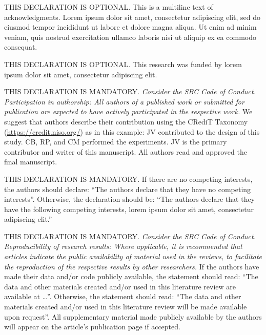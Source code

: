 \documentclass[english]{sbc2025}%
\begin{document}
\begin{declarations}

\begin{acknowledgements}
THIS DECLARATION IS OPTIONAL. 
This is a multiline text of acknowledgments. 
Lorem ipsum dolor sit amet, consectetur adipiscing elit, 
sed do eiusmod tempor incididunt ut labore et dolore magna aliqua. 
Ut enim ad minim veniam, quis nostrud exercitation ullamco laboris nisi ut aliquip ex ea commodo consequat.
\end{acknowledgements}

\begin{funding}
THIS DECLARATION IS OPTIONAL. This research was funded by lorem ipsum dolor sit amet, consectetur adipiscing elit.
\end{funding}

\begin{contributions}
THIS DECLARATION IS MANDATORY. 
\textit{Consider the SBC Code of Conduct.
Participation in authorship: All authors of a published work
or submitted for publication are expected to have actively participated in the respective work.}
We suggest that authors describe their contribution using
the CRediT Taxonomy (\href{https://credit.niso.org/}{https://credit.niso.org/}) as in this example:
JV contributed to the design of this study. CB, RP, and CM performed the experiments.
JV is the primary contributor and writer of this manuscript.
All authors read and approved the final manuscript.
\end{contributions}

\begin{interests}
THIS DECLARATION IS MANDATORY. If there are no competing interests, the authors should declare: ``The authors declare that they have no competing interests''. Otherwise, the declaration should be: ``The authors declare that they have the following competing interests, lorem ipsum dolor sit amet, consectetur adipiscing elit.''
\end{interests}

\begin{materials}
THIS DECLARATION IS MANDATORY. 
\textit{Consider the SBC Code of Conduct.
Reproducibility of research results:
Where applicable, it is recommended that articles indicate
the public availability of material used in the reviews,
to facilitate the reproduction of the respective results by other researchers.}
%
If the authors have made their data and/or code publicly available, the statement should read:
``The data and other materials created and/or used in this literature review
are available at \ldots''.
Otherwise, the statement should read:
``The data and other materials created and/or used in this literature review
will be made available upon request''.
%
All supplementary material made publicly available by the authors will appear
on the article's publication page if accepted.
\end{materials}


\end{declarations}
\end{document}
